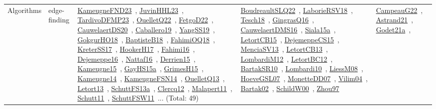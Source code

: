 {\begin{longtable}{lp{3cm}>{\raggedright\arraybackslash}p{6cm}>{\raggedright\arraybackslash}p{6cm}>{\raggedright\arraybackslash}p{8cm}}
Algorithms & edge-finding & \href{works/KameugneFND23.pdf}{KameugneFND23}~\cite{KameugneFND23}, \href{works/JuvinHHL23.pdf}{JuvinHHL23}~\cite{JuvinHHL23}, \href{works/TardivoDFMP23.pdf}{TardivoDFMP23}~\cite{TardivoDFMP23}, \href{works/OuelletQ22.pdf}{OuelletQ22}~\cite{OuelletQ22}, \href{works/FetgoD22.pdf}{FetgoD22}~\cite{FetgoD22}, \href{works/CauwelaertDS20.pdf}{CauwelaertDS20}~\cite{CauwelaertDS20}, \href{works/Caballero19.pdf}{Caballero19}~\cite{Caballero19}, \href{works/YangSS19.pdf}{YangSS19}~\cite{YangSS19}, \href{works/GokgurHO18.pdf}{GokgurHO18}~\cite{GokgurHO18}, \href{works/BaptisteB18.pdf}{BaptisteB18}~\cite{BaptisteB18}, \href{works/FahimiOQ18.pdf}{FahimiOQ18}~\cite{FahimiOQ18}, \href{works/KreterSS17.pdf}{KreterSS17}~\cite{KreterSS17}, \href{works/HookerH17.pdf}{HookerH17}~\cite{HookerH17}, \href{works/Fahimi16.pdf}{Fahimi16}~\cite{Fahimi16}, \href{works/Dejemeppe16.pdf}{Dejemeppe16}~\cite{Dejemeppe16}, \href{works/Nattaf16.pdf}{Nattaf16}~\cite{Nattaf16}, \href{works/Derrien15.pdf}{Derrien15}~\cite{Derrien15}, \href{works/Kameugne15.pdf}{Kameugne15}~\cite{Kameugne15}, \href{works/GayHS15a.pdf}{GayHS15a}~\cite{GayHS15a}, \href{works/GrimesH15.pdf}{GrimesH15}~\cite{GrimesH15}, \href{works/Kameugne14.pdf}{Kameugne14}~\cite{Kameugne14}, \href{works/KameugneFSN14.pdf}{KameugneFSN14}~\cite{KameugneFSN14}, \href{works/OuelletQ13.pdf}{OuelletQ13}~\cite{OuelletQ13}, \href{works/Letort13.pdf}{Letort13}~\cite{Letort13}, \href{works/SchuttFS13a.pdf}{SchuttFS13a}~\cite{SchuttFS13a}, \href{works/Clercq12.pdf}{Clercq12}~\cite{Clercq12}, \href{works/Malapert11.pdf}{Malapert11}~\cite{Malapert11}, \href{works/Schutt11.pdf}{Schutt11}~\cite{Schutt11}, \href{works/SchuttFSW11.pdf}{SchuttFSW11}~\cite{SchuttFSW11}... (Total: 49) & \href{works/BoudreaultSLQ22.pdf}{BoudreaultSLQ22}~\cite{BoudreaultSLQ22}, \href{works/LaborieRSV18.pdf}{LaborieRSV18}~\cite{LaborieRSV18}, \href{works/Tesch18.pdf}{Tesch18}~\cite{Tesch18}, \href{works/GingrasQ16.pdf}{GingrasQ16}~\cite{GingrasQ16}, \href{works/CauwelaertDMS16.pdf}{CauwelaertDMS16}~\cite{CauwelaertDMS16}, \href{works/Siala15a.pdf}{Siala15a}~\cite{Siala15a}, \href{works/LetortCB15.pdf}{LetortCB15}~\cite{LetortCB15}, \href{works/DejemeppeCS15.pdf}{DejemeppeCS15}~\cite{DejemeppeCS15}, \href{works/MenciaSV13.pdf}{MenciaSV13}~\cite{MenciaSV13}, \href{works/LetortCB13.pdf}{LetortCB13}~\cite{LetortCB13}, \href{works/LombardiM12.pdf}{LombardiM12}~\cite{LombardiM12}, \href{works/LetortBC12.pdf}{LetortBC12}~\cite{LetortBC12}, \href{works/BartakSR10.pdf}{BartakSR10}~\cite{BartakSR10}, \href{works/Lombardi10.pdf}{Lombardi10}~\cite{Lombardi10}, \href{works/LiessM08.pdf}{LiessM08}~\cite{LiessM08}, \href{works/HoeveGSL07.pdf}{HoeveGSL07}~\cite{HoeveGSL07}, \href{works/MonetteDD07.pdf}{MonetteDD07}~\cite{MonetteDD07}, \href{works/Vilim04.pdf}{Vilim04}~\cite{Vilim04}, \href{works/Bartak02.pdf}{Bartak02}~\cite{Bartak02}, \href{works/SchildW00.pdf}{SchildW00}~\cite{SchildW00}, \href{works/Zhou97.pdf}{Zhou97}~\cite{Zhou97} & \href{works/CampeauG22.pdf}{CampeauG22}~\cite{CampeauG22}, \href{works/Astrand21.pdf}{Astrand21}~\cite{Astrand21}, \href{works/Godet21a.pdf}{Godet21a}~\cite{Godet21a}, 
\end{longtable}}
